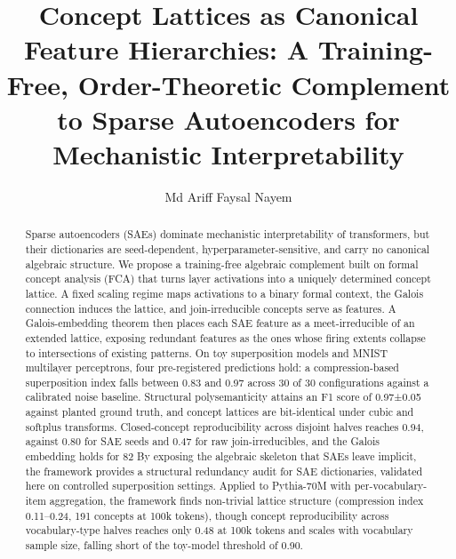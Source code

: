 \documentclass[a4paper,fleqn]{cas-dc}
\begin{document}
\let\WriteBookmarks\relax
\def\floatpagepagefraction{1}
\def\textpagefraction{.001}


\title[mode = title]{Concept Lattices as Canonical Feature Hierarchies: A Training-Free, Order-Theoretic Complement to Sparse Autoencoders for Mechanistic Interpretability}

\author[1]{Md Ariff Faysal Nayem}
\cormark[1]



\begin{abstract}
Sparse autoencoders (SAEs) dominate mechanistic interpretability of transformers, but their dictionaries are seed-dependent, hyperparameter-sensitive, and carry no canonical algebraic structure.
We propose a training-free algebraic complement built on formal concept analysis (FCA) that turns layer activations into a uniquely determined concept lattice.
A fixed scaling regime maps activations to a binary formal context, the Galois connection induces the lattice, and join-irreducible concepts serve as features.
A Galois-embedding theorem then places each SAE feature as a meet-irreducible of an extended lattice, exposing redundant features as the ones whose firing extents collapse to intersections of existing patterns.
On toy superposition models and MNIST multilayer perceptrons, four pre-registered predictions hold: a compression-based superposition index falls between 0.83 and 0.97 across 30 of 30 configurations against a calibrated noise baseline.
Structural polysemanticity attains an F1 score of 0.97±0.05 against planted ground truth, and concept lattices are bit-identical under cubic and softplus transforms.
Closed-concept reproducibility across disjoint halves reaches 0.94, against 0.80 for SAE seeds and 0.47 for raw join-irreducibles, and the Galois embedding holds for 82%
By exposing the algebraic skeleton that SAEs leave implicit, the framework provides a structural redundancy audit for SAE dictionaries, validated here on controlled superposition settings.
Applied to Pythia-70M with per-vocabulary-item aggregation, the framework finds non-trivial lattice structure (compression index 0.11--0.24, 191 concepts at 100k tokens), though concept reproducibility across vocabulary-type halves reaches only 0.48 at 100k tokens and scales with vocabulary sample size, falling short of the toy-model threshold of 0.90.
\end{abstract}
\end{document}
